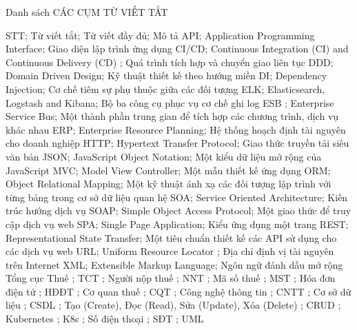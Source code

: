 Danh sách CÁC CỤM TỪ VIẾT TẮT

STT; Từ viết tắt; Từ viết đầy đủ; Mô tả
API; Application Programming Interface; Giao diện lập trình ứng dụng
CI/CD; Continuous Integration (CI) and Continuous Delivery (CD) ; Quá trình tích hợp và chuyển giao liên tục
DDD; Domain Driven Design; Kỹ thuật thiết kế theo hướng miền
DI; Dependency Injection; Cơ chế tiêm sự phụ thuộc giữa các đối tượng
ELK; Elasticsearch, Logstash and Kibana; Bộ ba công cụ phục vụ cơ chế ghi log
ESB ; Enterprise Service Bus; Một thành phần trung gian để tích hợp các chương trình, dịch vụ khác nhau
ERP; Enterprise Resource Planning; Hệ thống hoạch định tài nguyên cho doanh nghiệp
HTTP; Hypertext Transfer Protocol; Giao thức truyền tải siêu văn bản
JSON; JavaScript Object Notation; Một kiểu dữ liệu mở rộng của JavaScript
MVC; Model View Controller; Một mẫu thiết kế ứng dụng
ORM; Object Relational Mapping; Một kỹ thuật ánh xạ các đối tượng lập trình với từng bảng trong cơ sở dữ liệu quan hệ
SOA; Service Oriented Architecture; Kiến trúc hướng dịch vụ
SOAP; Simple Object Access Protocol; Một giao thức để truy cập dịch vụ web
SPA; Single Page Application; Kiểu ứng dụng một trang
REST; Representational State Transfer; Một tiêu chuẩn thiết kế các API sử dụng cho các dịch vụ web
URL; Uniform Resource Locator ; Địa chỉ định vị tài nguyên trên Internet
XML; Extensible Markup Language; Ngôn ngữ đánh dấu mở rộng
Tổng cục Thuế ; TCT ;  
Người nộp thuế ; NNT ;  
Mã số thuế ; MST ;  
Hóa đơn điện tử ; HĐĐT ;  
Cơ quan thuế ; CQT ;  
Công nghệ thông tin ; CNTT ;  
Cơ sở dữ liệu ; CSDL ;  
Tạo (Create), Đọc (Read), Sửa (Update), Xóa (Delete) ; CRUD ;  
Kubernetes ; K8s ;  
Số điện thoại ; SĐT ;
UML